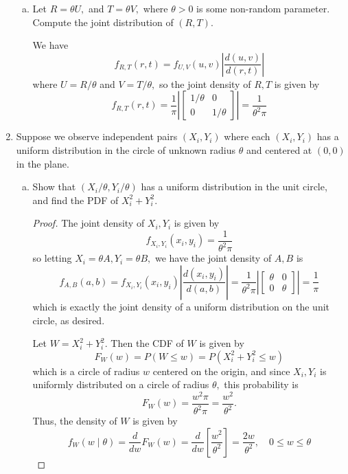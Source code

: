 \documentclass{article}
\begin{document}
\begin{enumerate}
\begin{enumerate}[(a)]
			\item Let $R=\theta U,$ and $T=\theta V,$ where $\theta>0$ is some non-random parameter. Compute the joint distribution of $(R, T).$
				\begin{soln}
					We have \[f_{R, T}(r, t) = f_{U, V}(u, v) \left\lvert \frac{d(u, v)}{d(r, t)} \right\rvert\] where $U=R/\theta$ and $V=T/\theta,$ so the joint density of $R, T$ is given by \[f_{R, T}(r, t) = \frac{1}{\pi}\left\lvert \begin{bmatrix}
							1/\theta & 0 \\ 0 & 1/\theta
					\end{bmatrix}\right\rvert = \frac{1}{\theta^2\pi}\]
				\end{soln}
				
		\end{enumerate}

	\item Suppose we observe independent pairs $(X_i, Y_i)$ where each $(X_i, Y_i)$ has a uniform distribution in the circle of unknown radius $\theta$ and centered at $(0, 0)$ in the plane.

		\begin{enumerate}[(a)]
			\item Show that $(X_i/\theta, Y_i/\theta)$ has a uniform distribution in the unit circle, and find the PDF of $X_i^2+Y_i^2.$
				\begin{proof}
					The joint density of $X_i, Y_i$ is given by \[f_{X_i, Y_i}(x_i, y_i)=\frac{1}{\theta^2\pi}\] so letting $X_i=\theta A, Y_i=\theta B,$ we have the joint density of $A, B$ is \[f_{A, B}(a, b)=f_{X_i, Y_i}(x_i, y_i)\left\lvert \frac{d(x_i, y_i)}{d(a, b)} \right\rvert = \frac{1}{\theta^2\pi} \left\lvert \begin{bmatrix}
						\theta & 0 \\ 0 & \theta
				\end{bmatrix}\right\rvert = \frac{1}{\pi}\] which is exactly the joint density of a uniform distribution on the unit circle, as desired.

				Let $W=X_i^2+Y_i^2.$ Then the CDF of $W$ is given by \[F_W(w)=P(W\le w)=P(X_i^2+Y_i^2\le w)\] which is a circle of radius $w$ centered on the origin, and since $X_i, Y_i$ is uniformly distributed on a circle of radius $\theta,$ this probability is \[F_W(w)=\frac{w^2\pi}{\theta^2\pi}=\frac{w^2}{\theta^2}.\] Thus, the density of $W$ is given by \[f_W(w\mid\theta)=\frac{d}{dw}F_W(w)=\frac{d}{dw}\left[ \frac{w^2}{\theta^2} \right]=\frac{2w}{\theta^2}, \quad 0\le w\le \theta\]
				

\end{proof}
\end{enumerate}
\end{enumerate}
\end{document}
